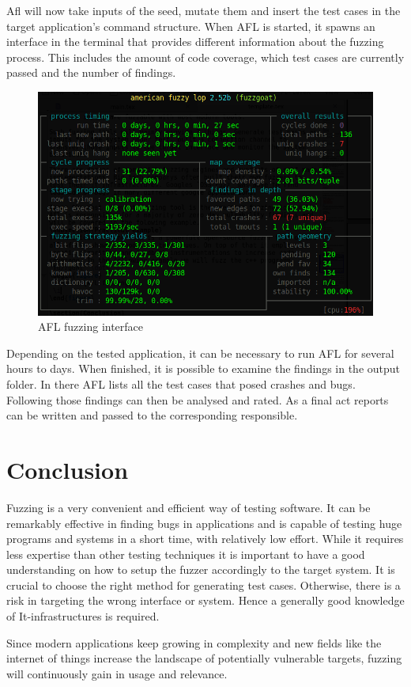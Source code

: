 \documentclass[journal=tosc,final]{iacrtrans}
\begin{document}
Afl will now take inputs of the seed, mutate them and insert the test cases in the target application’s command structure.
When AFL is started, it spawns an interface in the terminal that provides different information about the fuzzing process. This includes the amount of code coverage, which test cases are currently passed and the number of findings. 
\begin{figure}[h]
 \caption{AFL fuzzing interface}
 \begin{center}
   \includegraphics[scale=0.35]{afl.png}

 \end{center}
\end{figure}

Depending on the tested application, it can be necessary to run AFL for several hours to days. When finished, it is possible to examine the findings in the output folder. In there AFL lists all the test cases that posed crashes and bugs. Following those findings can then be analysed and rated. As a final act reports can be written and passed to the corresponding responsible.


\section{Conclusion}
Fuzzing is a very convenient and efficient way of testing software. It can be remarkably effective in finding bugs in applications and is capable of testing huge programs and systems in a short time, with relatively low effort. While it requires less expertise than other testing techniques it is important to have a good understanding on how to setup the fuzzer accordingly to the target system. It is crucial to choose the right method for generating test cases. Otherwise, there is a risk in targeting the wrong interface or system. Hence a generally good knowledge of It-infrastructures is required.

Since modern applications keep growing in complexity and new fields like the internet of things increase the landscape of potentially vulnerable targets, fuzzing will continuously gain in usage and relevance.
\newpage


\end{document}
